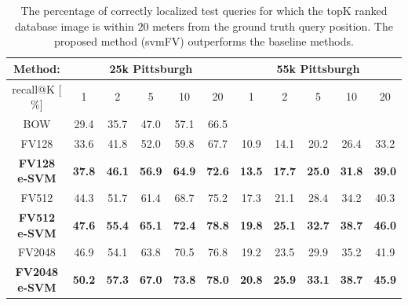 \documentclass[table]{article} %
\begin{document}
\begin{table}[t!]
\begin{centering}
	\begin{tabularx}{0.94\linewidth}{|c|c c c c c|c c c c c|}
		\hline 
		\rowcolor{maroon!50}
		Method: & \multicolumn{5}{c|}{25k Pittsburgh} & \multicolumn{5}{c|}{55k Pittsburgh} \\
		\hline 
		\hline 
		\rowcolor{maroon!50}
		recall@K [$\%$] & 1 & 2 & 5 & 10 & 20 & 1 & 2 & 5 & 10 & 20\\
		\hline
		\rowcolor{maroon!10}
		BOW & 29.4 & 35.7 & 47.0 & 57.1 & 66.5 &  &  &  &  & \\
        \hline
		\rowcolor{maroon!10}
		FV128         & 33.6 & 41.8 & 52.0 & 59.8 & 67.7 & 10.9 & 14.1 & 20.2 & 26.4 & 33.2 \\
		\rowcolor{maroon!10}
		\textbf{FV128 e-SVM}   & \textbf{37.8}  & \textbf{46.1} & \textbf{56.9} & \textbf{64.9} & \textbf{72.6}  &
                                 \textbf{13.5}  &  \textbf{17.7}  &  \textbf{25.0}  &  \textbf{31.8}  &  \textbf{39.0} \\
        \hline
        \rowcolor{maroon!10}
        FV512         & 44.3 & 51.7 & 61.4 & 68.7 & 75.2 & 17.3 &  21.1 &  28.4 &  34.2 &  40.3 \\
        \rowcolor{maroon!10}
        \textbf{FV512 e-SVM}   & \textbf{47.6}  & \textbf{55.4} & \textbf{65.1} & \textbf{72.4} & \textbf{78.8}  &
                                 \textbf{19.8} &  \textbf{25.1} &  \textbf{32.7}  & \textbf{38.7} &  \textbf{46.0} \\
        \hline
		\rowcolor{maroon!10}
		FV2048        & 46.9  & 54.1 & 63.8 & 70.5 & 76.8 & 19.2 & 23.5 & 29.9 &  35.2 &  41.9 \\
		\rowcolor{maroon!10}
		\textbf{FV2048 e-SVM}  & \textbf{50.2} & \textbf{57.3} & \textbf{67.0} & \textbf{73.8} & \textbf{78.0} &
        \textbf{20.8} & \textbf{25.9} & \textbf{33.1} & \textbf{38.7} & \textbf{45.9}\\
        \hline
	\end{tabularx}
	\caption{ \textcolor{myRed}{}
		The percentage of correctly localized test queries for which the topK ranked database image is within $20$ meters from the ground truth query position. The proposed method (svmFV) outperforms the baseline methods.
		}
	\label{tab:recall}
\end{centering}
\end{table}
\end{document}
